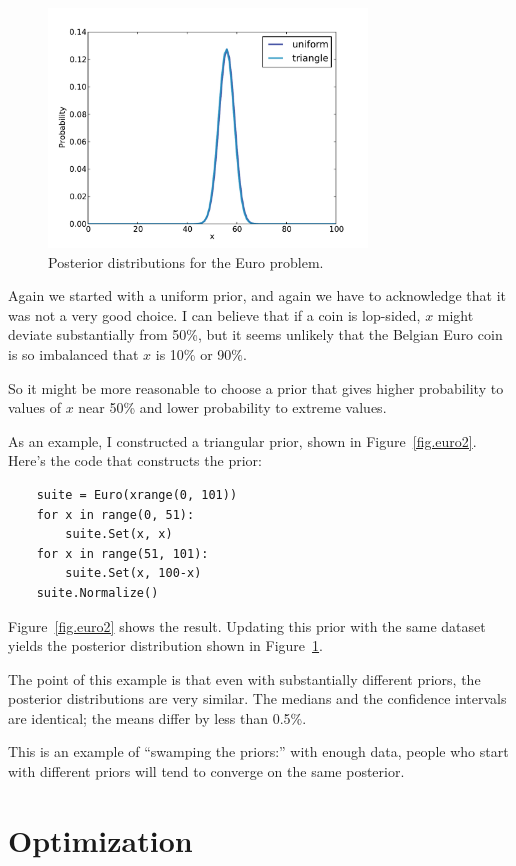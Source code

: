 \documentclass[12pt]{book}
\begin{document}
\begin{figure}
\centerline{\includegraphics[height=2.5in]{figs/euro3.pdf}}
\caption{Posterior distributions for the Euro problem.}
\label{fig.euro3}
\end{figure}

Again we started with a uniform prior, and again we have to
acknowledge that it was not a very good choice. I can believe
that if a coin is lop-sided, $x$ might deviate substantially from
50\%, but it seems unlikely that the Belgian Euro coin is so
imbalanced that $x$ is 10\% or 90\%.

So it might be more reasonable to choose a prior that gives
higher probability to values of $x$ near 50\% and lower probability
to extreme values.

As an example, I constructed a triangular prior, shown in
Figure~\ref{fig.euro2}.  Here's the code that constructs the prior:

\begin{verbatim}
    suite = Euro(xrange(0, 101))
    for x in range(0, 51):
        suite.Set(x, x)
    for x in range(51, 101):
        suite.Set(x, 100-x) 
    suite.Normalize()
\end{verbatim}

Figure~\ref{fig.euro2} shows the result.  Updating this prior
with the same dataset yields the posterior distribution shown
in Figure~\ref{fig.euro3}.

The point of this example is that even with substantially different
priors, the posterior distributions are very similar.  The medians
and the confidence intervals are identical; the means differ by
less than 0.5\%.

This is an example of ``swamping the priors:'' with enough
data, people who start with different priors will tend to
converge on the same posterior.


\section{Optimization}
\label{optimization}
\end{document}

